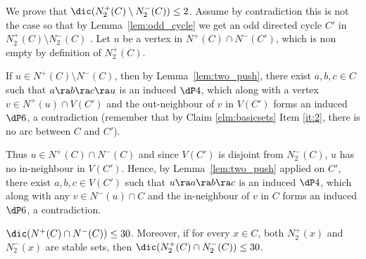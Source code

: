 \begin{subproof}
We prove that $\dic(N^{+}_2(C) \setminus N^{-}_2(C)) \leq 2$. Assume by contradiction this is not the case so that by Lemma~\ref{lem:odd_cycle} we get an odd directed cycle $C'$ in $N^{+}_2(C) \setminus N^{-}_2(C)$ .  Let $u$ be a vertex in $N^{+}(C) \cap N^-(C')$, which is non empty by definition of $N^{+}_2(C)$.

If $u \in N^{+}(C) \setminus N^{-}(C)$, then by Lemma~\ref{lem:two_push}, there exist $a,b,c \in C$ such that $a \ra b \ra c \ra u$ is an induced $\dP4$, which along with a vertex $v \in N^+(u) \cap V(C')$ and the out-neighbour of $v$ in $V(C')$ forms an induced $\dP6$, a contradiction (remember that by Claim \ref{clm:basicsets} Item \ref{it:2}, there is no arc between $C$ and $C'$). 

Thus $u \in N^{+}(C) \cap N^{-}(C)$ and since $V(C')$ is disjoint from $N^{-}_2(C)$, $u$ has no in-neighbour in $V(C')$. Hence, by Lemma~\ref{lem:two_push} applied on $C'$, there exist $a,b,c \in V(C')$ such that $u\ra a \ra b \ra c$ is an induced $\dP4$, which along with any $v \in N^-(u) \cap C$ and the in-neighbour of $v$ in $C$ forms an induced $\dP6$, a contradiction.
\end{subproof}


\begin{claim}\label{clm:hard}
$\dic(N^{+}(C) \cap N^{-}(C)) \leq 30$. Moreover, if for every $x \in C$, both $N_2^+(x)$ and $N_2^-(x)$ are  stable sets, then $\dic(N_2^+(C) \cap N_2^-(C)) \leq 30$. 
\end{claim}

